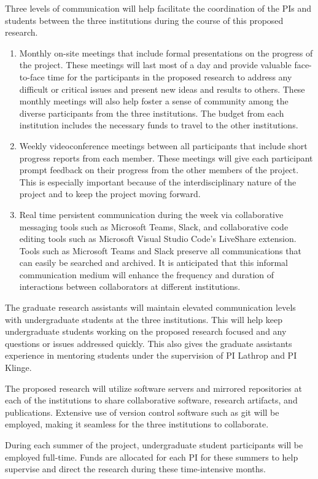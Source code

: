 \documentclass[11pt]{article}
\begin{document}
      Three levels of communication will help facilitate the coordination of the PIs and students between the three institutions during the course of this proposed research.
      \begin{enumerate}
        \item
        Monthly on-site meetings that include formal presentations on the progress of the project.
        These meetings will last most of a day and provide valuable face-to-face time for the participants in the proposed research to address any difficult or critical issues and present new ideas and results to others.
        These monthly meetings will also help foster a sense of community among the diverse participants from the three institutions.
        The budget from each institution includes the necessary funds to travel to the other institutions.

        \item
        Weekly videoconference meetings between all participants that include short progress reports from each member.
        These meetings will give each participant prompt feedback on their progress from the other members of the project.
        This is especially important because of the interdisciplinary nature of the project and to keep the project moving forward.

        \item
        Real time persistent communication during the week via collaborative messaging tools such as Microsoft Teams, Slack, and collaborative code editing tools such as Microsoft Visual Studio Code's LiveShare extension.
        Tools such as Microsoft Teams and Slack preserve all communications that can easily be searched and archived.
        It is anticipated that this informal communication medium will enhance the frequency and duration of interactions between collaborators at different institutions.
      \end{enumerate}
      
      The graduate research assistants will maintain elevated communication levels with undergraduate students at the three institutions.
      This will help keep undergraduate students working on the proposed research focused and any questions or issues addressed quickly.
      This also gives the graduate assistants experience in mentoring students under the supervision of PI Lathrop and PI Klinge.
       
      The proposed research will utilize software servers and mirrored repositories at each of the institutions to share collaborative software, research artifacts, and publications.
      Extensive use of version control software such as git will be employed, making it seamless for the three institutions to collaborate.

      During each summer of the project, undergraduate student participants will be employed full-time.
      Funds are allocated for each PI for these summers to help supervise and direct the research during these time-intensive months.
    
\end{document}
